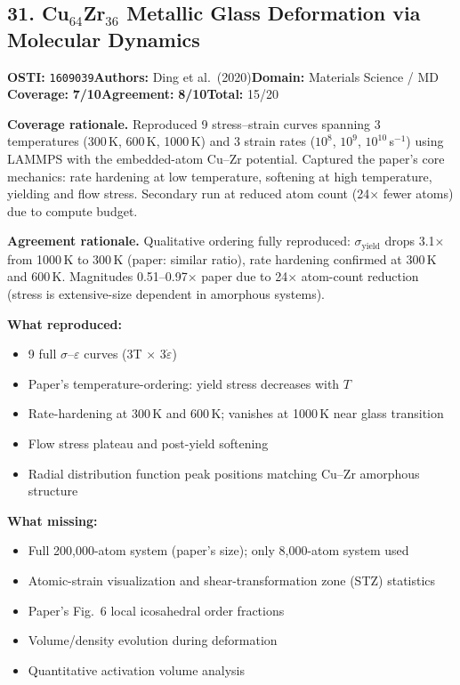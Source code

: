 \documentclass[11pt]{article}
\newcommand{\scorebadge}[2]{\textbf{#1:} \textbf{#2/10}}
\begin{document}
\subsection{31. Cu$_{64}$Zr$_{36}$ Metallic Glass Deformation via Molecular Dynamics}
\textbf{OSTI:} \texttt{1609039}\quad\textbf{Authors:} Ding et al.\ (2020)\quad\textbf{Domain:} Materials Science / MD\\
\scorebadge{Coverage}{7}\quad\scorebadge{Agreement}{8}\quad\textbf{Total:} 15/20\par\smallskip
\noindent\textbf{Coverage rationale.} Reproduced 9 stress--strain curves spanning 3 temperatures (300\,K, 600\,K, 1000\,K) and 3 strain rates ($10^8$, $10^9$, $10^{10}$\,s$^{-1}$) using LAMMPS with the embedded-atom Cu--Zr potential. Captured the paper's core mechanics: rate hardening at low temperature, softening at high temperature, yielding and flow stress. Secondary run at reduced atom count (24$\times$ fewer atoms) due to compute budget.\par
\noindent\textbf{Agreement rationale.} Qualitative ordering fully reproduced: $\sigma_\mathrm{yield}$ drops 3.1$\times$ from 1000\,K to 300\,K (paper: similar ratio), rate hardening confirmed at 300\,K and 600\,K. Magnitudes 0.51--0.97$\times$ paper due to 24$\times$ atom-count reduction (stress is extensive-size dependent in amorphous systems).\par\smallskip
\noindent\textbf{What reproduced:}
\begin{itemize}[leftmargin=1.4em,itemsep=0.2em,topsep=0.2em]
\item 9 full $\sigma$--$\varepsilon$ curves (3T $\times$ 3$\dot{\varepsilon}$)
\item Paper's temperature-ordering: yield stress decreases with $T$
\item Rate-hardening at 300\,K and 600\,K; vanishes at 1000\,K near glass transition
\item Flow stress plateau and post-yield softening
\item Radial distribution function peak positions matching Cu--Zr amorphous structure
\end{itemize}
\noindent\textbf{What missing:}
\begin{itemize}[leftmargin=1.4em,itemsep=0.2em,topsep=0.2em]
\item Full 200,000-atom system (paper's size); only 8,000-atom system used
\item Atomic-strain visualization and shear-transformation zone (STZ) statistics
\item Paper's Fig.~6 local icosahedral order fractions
\item Volume/density evolution during deformation
\item Quantitative activation volume analysis
\end{itemize}
\end{document}
